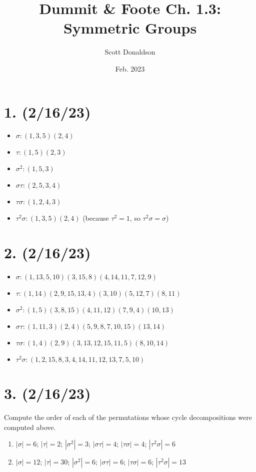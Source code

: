 \documentclass{article}
\title{Dummit \& Foote Ch. 1.3: Symmetric Groups}
\author{Scott Donaldson}
\date{Feb. 2023}
\begin{document}
\maketitle

\section*{1. (2/16/23)}

\begin{itemize}
    \item $\sigma: (1, 3, 5)(2, 4)$
    \item $\tau: (1, 5)(2, 3)$
    \item $\sigma^2: (1, 5, 3)$
    \item $\sigma \tau: (2, 5, 3, 4)$
    \item $\tau \sigma: (1, 2, 4, 3)$
    \item $\tau^2 \sigma: (1, 3, 5)(2, 4)$ (because $\tau^2 = 1$, so $\tau^2 \sigma = \sigma$)
\end{itemize}

\section*{2. (2/16/23)}

\begin{itemize}
    \item $\sigma: (1,13,5,10)(3,15,8)(4,14,11,7,12,9)$
    \item $\tau: (1, 14)(2, 9, 15, 13, 4)(3, 10)(5, 12, 7)(8, 11)$
    \item $\sigma^2: (1, 5)(3, 8, 15)(4, 11, 12)(7, 9, 4)(10, 13)$
    \item $\sigma \tau: (1, 11, 3)(2, 4)(5, 9, 8, 7, 10, 15)(13, 14)$
    \item $\tau \sigma: (1, 4)(2, 9)(3, 13, 12, 15, 11, 5)(8, 10, 14)$
    \item $\tau^2 \sigma: (1, 2, 15, 8, 3, 4, 14, 11, 12, 13, 7, 5, 10)$
\end{itemize}

\section*{3. (2/16/23)}

Compute the order of each of the permutations whose cycle decompositions were computed above.

\begin{enumerate}
    \item $|\sigma| = 6$; $|\tau| = 2$; $|\sigma^2| = 3$; $|\sigma \tau| = 4$; $|\tau \sigma| = 4$; $|\tau^2 \sigma| = 6$
    \item $|\sigma| = 12$; $|\tau| = 30$; $|\sigma^2| = 6$; $|\sigma \tau| = 6$; $|\tau \sigma| = 6$; $|\tau^2 \sigma| = 13$
\end{enumerate}
\end{document}
